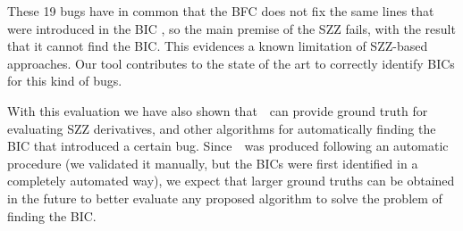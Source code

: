 These 19 bugs have in common that the BFC does not fix the same lines that were introduced in the BIC%
, so the main premise of the SZZ fails, with the result that it cannot find the BIC. 
This evidences a known limitation of SZZ-based approaches. 
Our tool contributes to the state of the art to correctly identify BICs for this kind of bugs. 

With this evaluation we have also shown that~\datasetName~can provide ground truth for evaluating SZZ derivatives, and other algorithms for automatically finding the BIC that introduced a certain bug. Since~\datasetName~was produced following an automatic procedure (we validated it manually, but the BICs were first identified in a completely automated way), we expect that larger ground truths can be obtained in the future to better evaluate any proposed algorithm to solve the problem of finding the BIC.



